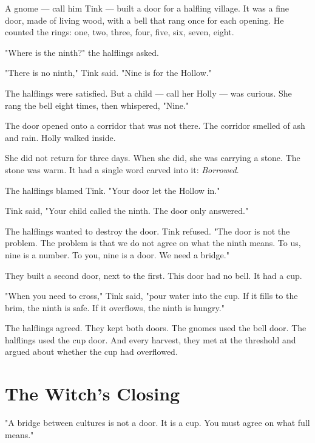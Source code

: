 \documentclass[10pt,twoside]{book}
\begin{document}
A gnome --- call him Tink --- built a door for a halfling village. It was a fine door, made of living wood, with a bell that rang once for each opening. He counted the rings: one, two, three, four, five, six, seven, eight.

"Where is the ninth?" the halflings asked.

"There is no ninth," Tink said. "Nine is for the Hollow."

The halflings were satisfied. But a child --- call her Holly --- was curious. She rang the bell eight times, then whispered, "Nine."

The door opened onto a corridor that was not there. The corridor smelled of ash and rain. Holly walked inside.

She did not return for three days. When she did, she was carrying a stone. The stone was warm. It had a single word carved into it: \textit{Borrowed}.

The halflings blamed Tink. "Your door let the Hollow in."

Tink said, "Your child called the ninth. The door only answered."

The halflings wanted to destroy the door. Tink refused. "The door is not the problem. The problem is that we do not agree on what the ninth means. To us, nine is a number. To you, nine is a door. We need a bridge."

They built a second door, next to the first. This door had no bell. It had a cup.

"When you need to cross," Tink said, "pour water into the cup. If it fills to the brim, the ninth is safe. If it overflows, the ninth is hungry."

The halflings agreed. They kept both doors. The gnomes used the bell door. The halflings used the cup door. And every harvest, they met at the threshold and argued about whether the cup had overflowed.

\section*{The Witch's Closing}
"A bridge between cultures is not a door. It is a cup. You must agree on what full means."
\end{document}
